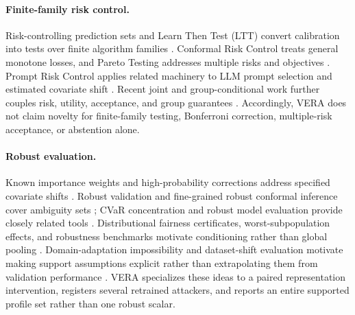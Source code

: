 \paragraph{Finite-family risk control.}
Risk-controlling prediction sets and Learn Then Test (LTT) convert calibration
into tests over finite algorithm families
\cite{bates2021rcps,angelopoulos2025ltt}. Conformal Risk Control treats general
monotone losses, and Pareto Testing addresses multiple risks and objectives
\cite{angelopoulos2024crc,laufer2023pareto}. Prompt Risk Control applies related
machinery to LLM prompt selection and estimated covariate shift
\cite{zollo2024prompt}. Recent joint and group-conditional work further couples
risk, utility, acceptance, and group guarantees
\cite{yu2026joint,huang2026conditional}. Accordingly, VERA does not claim
novelty for finite-family testing, Bonferroni correction, multiple-risk
acceptance, or abstention alone.

\paragraph{Robust evaluation.}
Known importance weights and high-probability corrections address specified
covariate shifts \cite{tibshirani2019covariate,almeida2025hprc}. Robust
validation and fine-grained robust conformal inference cover ambiguity sets
\cite{cauchois2024robust,ai2024finegrained}; CVaR concentration and robust model
evaluation provide closely related tools
\cite{thomas2019cvar,najafi2025federated,waudbysmith2024means}. Distributional
fairness certificates, worst-subpopulation effects, and robustness benchmarks
motivate conditioning rather than global pooling
\cite{kang2022certifying,ehyaei2025fragile,jeong2020worstcase,sagawa2020groupdro,koh2021wilds}.
Domain-adaptation impossibility and dataset-shift evaluation motivate making
support assumptions explicit rather than extrapolating them from validation
performance \cite{bendavid2010impossibility,subbaswamy2021evaluation}.
VERA specializes these ideas to a paired representation intervention, registers
several retrained attackers, and reports an entire supported profile set rather
than one robust scalar.


